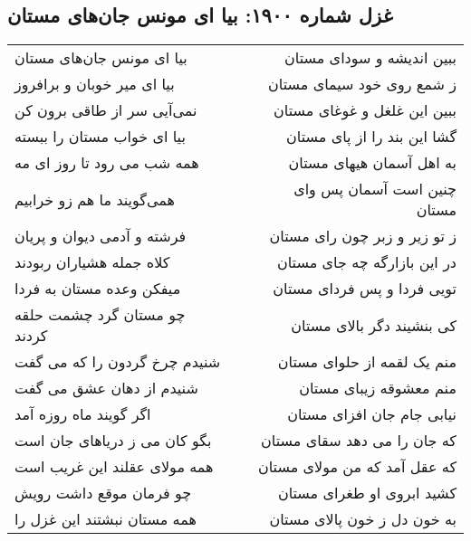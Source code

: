 \begin{center}
\section*{غزل شماره ۱۹۰۰: بیا ای مونس جان‌های مستان}
\label{sec:1900}
\begin{longtable}{l p{0.5cm} r}
بیا ای مونس جان‌های مستان
&&
ببین اندیشه و سودای مستان
\\
بیا ای میر خوبان و برافروز
&&
ز شمع روی خود سیمای مستان
\\
نمی‌آیی سر از طاقی برون کن
&&
ببین این غلغل و غوغای مستان
\\
بیا ای خواب مستان را ببسته
&&
گشا این بند را از پای مستان
\\
همه شب می رود تا روز ای مه
&&
به اهل آسمان هیهای مستان
\\
همی‌گویند ما هم زو خرابیم
&&
چنین است آسمان پس وای مستان
\\
فرشته و آدمی دیوان و پریان
&&
ز تو زیر و زبر چون رای مستان
\\
کلاه جمله هشیاران ربودند
&&
در این بازارگه چه جای مستان
\\
میفکن وعده مستان به فردا
&&
تویی فردا و پس فردای مستان
\\
چو مستان گرد چشمت حلقه کردند
&&
کی بنشیند دگر بالای مستان
\\
شنیدم چرخ گردون را که می گفت
&&
منم یک لقمه از حلوای مستان
\\
شنیدم از دهان عشق می گفت
&&
منم معشوقه زیبای مستان
\\
اگر گویند ماه روزه آمد
&&
نیابی جام جان افزای مستان
\\
بگو کان می ز دریاهای جان است
&&
که جان را می دهد سقای مستان
\\
همه مولای عقلند این غریب است
&&
که عقل آمد که من مولای مستان
\\
چو فرمان موقع داشت رویش
&&
کشید ابروی او طغرای مستان
\\
همه مستان نبشتند این غزل را
&&
به خون دل ز خون پالای مستان
\\
\end{longtable}
\end{center}

